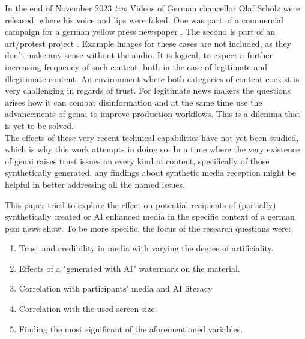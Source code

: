 \documentclass[
  a4paper,  %
  twoside,  %
  bibliography=totoc,
  headsepline,
  cleardoublepage=empty,
  parskip=half,
  draft=false
]{scrbook}
\begin{document}
In the end of November 2023 \textit{two} Videos of German chancellor Olaf Scholz were released, where his voice and lips were faked. One was part of a commercial campaign for a german yellow press newspaper \cite{dwdl.deSpringerTrommeltMit}. The second is part of an art/protest project \cite{zdfKunstinstallationDeepfakeScholzVerkuendet}. Example images for these cases are not included, as they don't make any sense without the audio. It is logical, to expect a further increasing frequency of such content, both in the case of legitimate and illegitimate content.
An environment where both categories of content coexist is very challenging in regards of trust. For legitimate news makers the questions arises how it can combat disinformation and at the same time use the advancements of \gls{genai} to improve production workflows. This is a dilemma that is yet to be solved. \\
The effects of these very recent technical capabilities have not yet been studied, which is why this work attempts in doing so. In a time where the very existence of \gls{genai} raises trust issues on every kind of content, specifically of those synthetically generated, any findings about synthetic media reception might be helpful in better addressing all the named issues.

This paper tried to explore the effect on potential recipients of (partially) synthetically created or AI enhanced media in the specific context of a german \gls{psm} news show. To be more specific, the focus of the research questions were: 

\begin{enumerate}
  \item Trust and credibility in media with varying the degree of artificiality.
  \item Effects of a "generated with AI" watermark on the material.
  \item Correlation with participants' media and AI literacy
  \item Correlation with the used screen size.
  \item Finding the most significant of the aforementioned variables.
\end{enumerate}
\end{document}
